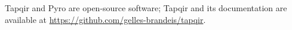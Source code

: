 Tapqir and Pyro are open-source software; Tapqir and its documentation are available at \url{https://github.com/gelles-brandeis/tapqir}.


\begin{comment}

NEW TODO LIST
- Update Abstract
- swap x and y in fig3
- coordinate system figure
- remake fig4 in python
- remake fig6 in python
- remake fig7, ed fig 4,5,6 in python and edit captions
- Extended Data Table 1: formatting, confidence ints., computation time
- Eq 31
- Edit paragraph two in Methods
- Extended Data Figure 2 caption
--on publication --
Data archive

\end{comment}

